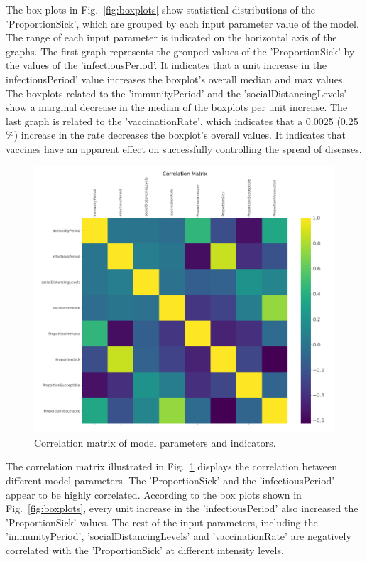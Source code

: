 \documentclass[smallextended]{svjour3}       %
\begin{document}
The box plots in Fig.~\ref{fig:boxplots} show statistical distributions of the 'ProportionSick', which are grouped by each input parameter value of the model. The range of each input parameter is indicated on the horizontal axis of the graphs. The first graph represents the grouped values of the 'ProportionSick' by the values of the 'infectiousPeriod'. It indicates that a unit increase in the infectiousPeriod' value increases the boxplot's overall median and max values. The boxplots related to the 'immunityPeriod' and the 'socialDistancingLevels' show a marginal decrease in the median of the boxplots per unit increase. The last graph is related to the 'vaccinationRate', which indicates that a 0.0025 (0.25 \%) increase in the rate decreases the boxplot’s overall values. It indicates that vaccines have an apparent effect on successfully controlling the spread of diseases.


\begin{figure}
	\centering
	\includegraphics[width=\linewidth]{figures/correlations.png}
	\caption{Correlation matrix of model parameters and indicators.\label{fig:correlations}}
\end{figure}


The correlation matrix illustrated in Fig.~\ref{fig:correlations} displays the correlation between different model parameters. The 'ProportionSick' and the 'infectiousPeriod' appear to be highly correlated. According to the box plots shown in Fig.~\ref{fig:boxplots}, every unit increase in the 'infectiousPeriod' also increased the 'ProportionSick' values. The rest of the input parameters, including the 'immunityPeriod', 'socialDistancingLevels' and 'vaccinationRate' are negatively correlated with the 'ProportionSick' at different intensity levels.
\end{document}
